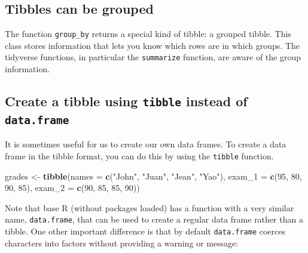 \documentclass[
]{krantz}
\newenvironment{Shaded}{\begin{snugshade}}{\end{snugshade}}
\newcommand{\CommentTok}[1]{\textcolor[rgb]{0.37,0.37,0.37}{\textit{#1}}}
\newcommand{\DataTypeTok}[1]{\textcolor[rgb]{0.27,0.27,0.27}{#1}}
\newcommand{\DecValTok}[1]{\textcolor[rgb]{0.06,0.06,0.06}{#1}}
\newcommand{\KeywordTok}[1]{\textcolor[rgb]{0.27,0.27,0.27}{\textbf{#1}}}
\newcommand{\NormalTok}[1]{#1}
\newcommand{\OperatorTok}[1]{\textcolor[rgb]{0.43,0.43,0.43}{\textbf{#1}}}
\newcommand{\StringTok}[1]{\textcolor[rgb]{0.5,0.5,0.5}{#1}}
\begin{document}
\hypertarget{tibbles-can-be-grouped}{%
\subsection{Tibbles can be grouped}\label{tibbles-can-be-grouped}}

The function \texttt{group\_by} returns a special kind of tibble: a grouped tibble. This class stores information that lets you know which rows are in which groups. The tidyverse functions, in particular the \texttt{summarize} function, are aware of the group information.

\hypertarget{create-a-tibble-using-tibble-instead-of-data.frame}{%
\subsection{\texorpdfstring{Create a tibble using \texttt{tibble} instead of \texttt{data.frame}}{Create a tibble using tibble instead of data.frame}}\label{create-a-tibble-using-tibble-instead-of-data.frame}}

It is sometimes useful for us to create our own data frames. To create a data frame in the tibble format, you can do this by using the \texttt{tibble} function.

\begin{Shaded}
\begin{Highlighting}[]
\NormalTok{grades <-}\StringTok{ }\KeywordTok{tibble}\NormalTok{(}\DataTypeTok{names =} \KeywordTok{c}\NormalTok{(}\StringTok{"John"}\NormalTok{, }\StringTok{"Juan"}\NormalTok{, }\StringTok{"Jean"}\NormalTok{, }\StringTok{"Yao"}\NormalTok{), }
                     \DataTypeTok{exam_1 =} \KeywordTok{c}\NormalTok{(}\DecValTok{95}\NormalTok{, }\DecValTok{80}\NormalTok{, }\DecValTok{90}\NormalTok{, }\DecValTok{85}\NormalTok{), }
                     \DataTypeTok{exam_2 =} \KeywordTok{c}\NormalTok{(}\DecValTok{90}\NormalTok{, }\DecValTok{85}\NormalTok{, }\DecValTok{85}\NormalTok{, }\DecValTok{90}\NormalTok{))}
\end{Highlighting}
\end{Shaded}

Note that base R (without packages loaded) has a function with a very similar name, \texttt{data.frame}, that can be used to create a regular data frame rather than a tibble. One other important difference is that by default \texttt{data.frame} coerces characters into factors without providing a warning or message:

\begin{Shaded}
\end{Shaded}
\end{document}
